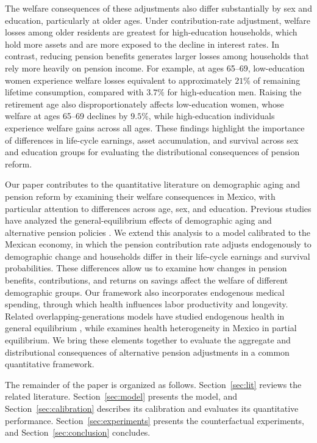 \documentclass[12pt,a4paper]{article}
\begin{document}
The welfare consequences of these adjustments also differ substantially by sex and education, particularly at older ages. Under contribution-rate adjustment, welfare losses among older residents are greatest for high-education households, which hold more assets and are more exposed to the decline in interest rates. In contrast, reducing pension benefits generates larger losses among households that rely more heavily on pension income. For example, at ages 65--69, low-education women experience welfare losses equivalent to approximately $21\%$ of remaining lifetime consumption, compared with $3.7\%$ for high-education men. Raising the retirement age also disproportionately affects low-education women, whose welfare at ages 65--69 declines by $9.5\%$, while high-education individuals experience welfare gains across all ages. These findings highlight the importance of differences in life-cycle earnings, asset accumulation, and survival across sex and education groups for evaluating the distributional consequences of pension reform.

Our paper contributes to the quantitative literature on demographic aging and pension reform by examining their welfare consequences in Mexico, with particular attention to differences across age, sex, and education. Previous studies have analyzed the general-equilibrium effects of demographic aging and alternative pension policies \citep{KruegerLudwig2007,Kitao2014}. We extend this analysis to a model calibrated to the Mexican economy, in which the pension contribution rate adjusts endogenously to demographic change and households differ in their life-cycle earnings and survival probabilities. These differences allow us to examine how changes in pension benefits, contributions, and returns on savings affect the welfare of different demographic groups. Our framework also incorporates endogenous medical spending, through which health influences labor productivity and longevity. Related overlapping-generations models have studied endogenous health in general equilibrium \citep{JungTranChambers2017}, while \citet{CortesEtAl2024} examines health heterogeneity in Mexico in partial equilibrium. We bring these elements together to evaluate the aggregate and distributional consequences of alternative pension adjustments in a common quantitative framework.

The remainder of the paper is organized as follows. Section~\ref{sec:lit} reviews the related literature. Section~\ref{sec:model} presents the model, and Section~\ref{sec:calibration} describes its calibration and evaluates its quantitative performance. Section~\ref{sec:experiments} presents the counterfactual experiments, and Section~\ref{sec:conclusion} concludes.
\end{document}
